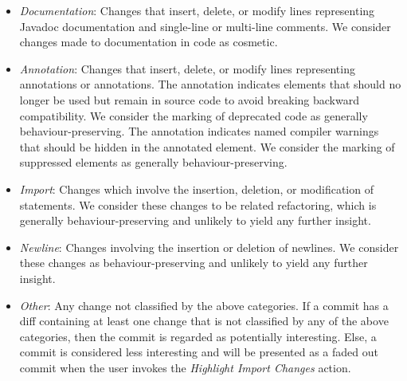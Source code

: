 \begin{itemize}
    \item \textit{Documentation}: Changes that insert, delete, or modify lines representing Javadoc documentation and single-line or multi-line comments. We consider changes made to documentation in code as cosmetic.
    \item \textit{Annotation}: \sloppy Changes that insert, delete, or modify lines representing  annotations or  annotations. The  annotation indicates elements that should no longer be used but remain in source code to avoid breaking backward compatibility. We consider the marking of deprecated code as generally behaviour-preserving. The  annotation indicates named compiler warnings that should be hidden in the annotated element. We consider the marking of  suppressed elements as generally behaviour-preserving.
    \item \textit{Import}: Changes which involve the insertion, deletion, or modification of  statements. We consider these changes to be related refactoring, which is generally behaviour-preserving and unlikely to yield any further insight.
    \item \textit{Newline}: Changes involving the insertion or deletion of newlines. We consider these changes as behaviour-preserving and unlikely to yield any further insight.
    \item \textit{Other}: Any change not classified by the above categories. If a commit has a diff containing at least one change that is not classified by any of the above categories, then the commit is regarded as potentially interesting. Else, a commit is considered less interesting and will be presented as a faded out commit when the user invokes the \emph{Highlight Import Changes} action.
\end{itemize}

